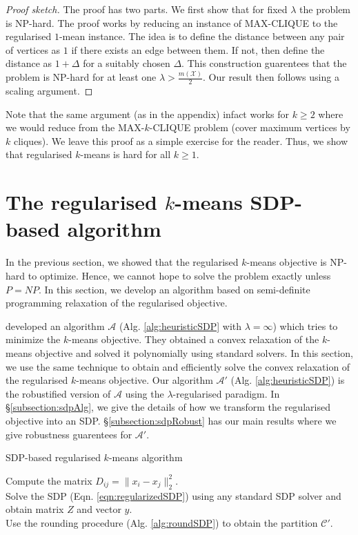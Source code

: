 \documentclass[12pt]{article}
\newcommand{\mc}{\mathcal}
\begin{document}
\begin{proof}[Proof sketch]
The proof has two parts. We first show that for fixed $\lambda$ the problem is NP-hard. The proof works by reducing an instance of MAX-CLIQUE to the regularised $1$-mean instance. The idea is to define the distance between any pair of vertices as $1$ if there exists an edge between them. If not, then define the distance as $1 + \Delta$ for a suitably chosen $\Delta$. This construction guarentees that the problem is NP-hard for at least one $\lambda > \frac{m(\mc X)}{2}$. Our result then follows using a scaling argument.
\end{proof}

Note that the same argument (as in the appendix) infact works for $k \ge 2$ where we would reduce from the MAX-$k$-CLIQUE problem (cover maximum vertices by $k$ cliques). We leave this proof as a simple exercise for the reader. Thus, we show that regularised $k$-means is hard for all $k \ge 1$. 

\section{The regularised $k$-means SDP-based algorithm}
\label{section:heuristic}
In the previous section, we showed that the regularised $k$-means objective is NP-hard to optimize. Hence, we cannot hope to solve the problem exactly unless $P=NP$. In this section, we develop an algorithm based on semi-definite programming relaxation of the regularised objective. 

\cite{peng2007approximating} developed an algorithm $\mc A$ (Alg. \ref{alg:heuristicSDP} with $\lambda = \infty$) which tries to minimize the $k$-means objective. They obtained a convex relaxation of the $k$-means objective and solved it polynomially using standard solvers. In this section, we use the same technique to obtain and efficiently solve the convex relaxation of the regularised $k$-means objective. Our algorithm $\mc A'$ (Alg. \ref{alg:heuristicSDP}) is the robustified version of $\mc A$ using the $\lambda$-regularised paradigm. In \S \ref{subsection:sdpAlg}, we give the details of how we transform the regularised objective into an SDP. \S \ref{subsection:sdpRobust} has our main results where we give robustness guarentees for $\mc A'$.    

\SetAlgoNoLine
\LinesNumbered
\begin{algorithm}[t]
\caption{SDP-based regularised $k$-means algorithm}
\label{alg:heuristicSDP}
	\Indp\KwIn{ $\mc{X} \subset R^d$, $k$, and hyperparameter $\lambda$.}
	\KwOut{$\mc C' := \{C_1, \ldots, C_k, C_{k+1}$\}.}
	
	Compute the matrix $D_{ij} = \|x_i-x_j\|^2_2$.\\
	Solve the SDP (Eqn. \ref{eqn:regularizedSDP}) using any standard SDP solver and obtain matrix $Z$ and vector $y$.\\
	Use the rounding procedure (Alg. \ref{alg:roundSDP}) to obtain the partition $\mc C'$. 
\end{algorithm}
\end{document}
